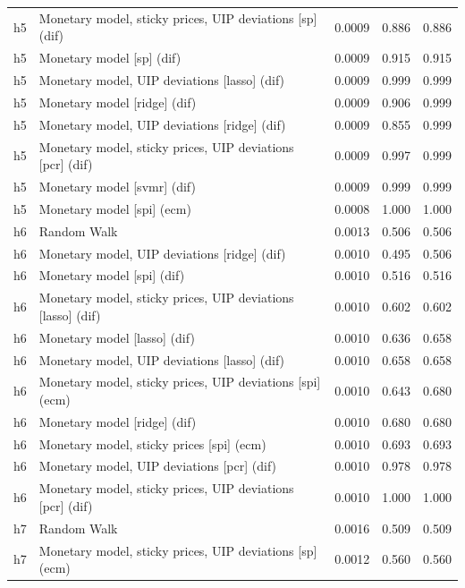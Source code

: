 \begin{ThreePartTable}
\begin{longtable}[t]{cp{5.5cm}ccc}
h5 & \raggedright Monetary model, sticky prices, UIP deviations [sp] (dif) & 0.0009 & 0.886 & 0.886\\
h5 & \raggedright Monetary model [sp] (dif) & 0.0009 & 0.915 & 0.915\\
h5 & \raggedright Monetary model, UIP deviations [lasso] (dif) & 0.0009 & 0.999 & 0.999\\
h5 & \raggedright Monetary model [ridge] (dif) & 0.0009 & 0.906 & 0.999\\
h5 & \raggedright Monetary model, UIP deviations [ridge] (dif) & 0.0009 & 0.855 & 0.999\\
h5 & \raggedright Monetary model, sticky prices, UIP deviations [pcr] (dif) & 0.0009 & 0.997 & 0.999\\
h5 & \raggedright Monetary model [svmr] (dif) & 0.0009 & 0.999 & 0.999\\
h5 & \raggedright Monetary model [spi] (ecm) & 0.0008 & 1.000 & 1.000\\
\addlinespace
h6 & \raggedright Random Walk & 0.0013 & 0.506 & 0.506\\
h6 & \raggedright Monetary model, UIP deviations [ridge] (dif) & 0.0010 & 0.495 & 0.506\\
h6 & \raggedright Monetary model [spi] (dif) & 0.0010 & 0.516 & 0.516\\
h6 & \raggedright Monetary model, sticky prices, UIP deviations [lasso] (dif) & 0.0010 & 0.602 & 0.602\\
h6 & \raggedright Monetary model [lasso] (dif) & 0.0010 & 0.636 & 0.658\\
h6 & \raggedright Monetary model, UIP deviations [lasso] (dif) & 0.0010 & 0.658 & 0.658\\
h6 & \raggedright Monetary model, sticky prices, UIP deviations [spi] (ecm) & 0.0010 & 0.643 & 0.680\\
h6 & \raggedright Monetary model [ridge] (dif) & 0.0010 & 0.680 & 0.680\\
h6 & \raggedright Monetary model, sticky prices [spi] (ecm) & 0.0010 & 0.693 & 0.693\\
h6 & \raggedright Monetary model, UIP deviations [pcr] (dif) & 0.0010 & 0.978 & 0.978\\
h6 & \raggedright Monetary model, sticky prices, UIP deviations [pcr] (dif) & 0.0010 & 1.000 & 1.000\\
\addlinespace
h7 & \raggedright Random Walk & 0.0016 & 0.509 & 0.509\\
h7 & \raggedright Monetary model, sticky prices, UIP deviations [sp] (ecm) & 0.0012 & 0.560 & 0.560\\

\end{longtable}
\end{ThreePartTable}
